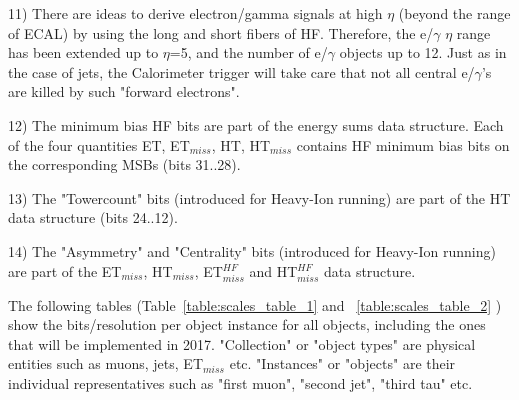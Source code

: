\documentclass{cmspaper}
\begin{document}
11) There are ideas to derive electron/gamma signals at high $\eta$ (beyond the range of ECAL) by using the long and short fibers of HF. Therefore, the e/$\gamma$ $\eta$ range has been extended up to $\eta$=5, and the number of e/$\gamma$ objects up to 12. Just as in the case of jets, the Calorimeter trigger will take care that not all central e/$\gamma$'s are killed by such "forward electrons".

12) The minimum bias HF bits are part of the energy sums data structure. Each of the four quantities ET, ET$_{miss}$, HT, HT$_{miss}$ contains HF minimum bias bits on the corresponding MSBs (bits 31..28).

13) The "Towercount" bits (introduced for Heavy-Ion running) are part of the HT data structure (bits 24..12).

14) The "Asymmetry" and "Centrality" bits (introduced for Heavy-Ion running) are part of the ET$_{miss}$, HT$_{miss}$, ET$_{miss}^{HF}$ and HT$_{miss}^{HF}$ data structure.

The following tables (Table~\ref{table:scales_table_1} and ~\ref{table:scales_table_2} ) show the  bits/resolution per object instance for all objects, including the ones that will be implemented in 2017. "Collection" or "object types" are physical entities such as muons, jets, ET$_{miss}$ etc. "Instances" or "objects" are their individual representatives such as "first muon", "second jet", "third tau" etc.
\end{document}
